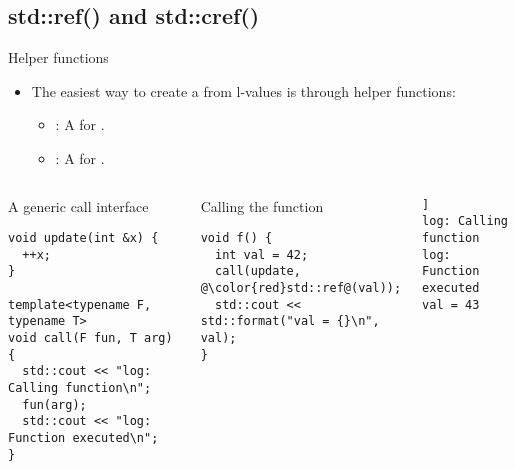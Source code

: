 \subsection{std::ref() and std::cref()}

\begin{frame}[t,fragile]{Helper functions}
\begin{itemize}
  \item The easiest way to create a  from l-values 
        is through helper functions:
    \begin{itemize}
      \item {}: A  for .
      \item {}: A  for .
    \end{itemize}
\end{itemize}

\begin{columns}[T]

\begin{block}{A generic call interface}
\begin{lstlisting}[basicstyle=\mode<presentation>{\tiny}]
void update(int &x) {
  ++x;
}

template<typename F, typename T>
void call(F fun, T arg) {
  std::cout << "log: Calling function\n";
  fun(arg);
  std::cout << "log: Function executed\n";
}
\end{lstlisting}
\end{block}

\pause
{}
\begin{block}{Calling the function}
\begin{lstlisting}[basicstyle=\mode<presentation>{\tiny},escapechar=@]
void f() {
  int val = 42;
  call(update, @\color{red}std::ref@(val));
  std::cout << std::format("val = {}\n", val);
}
\end{lstlisting}
\end{block}

\pause
\begin{lstlisting}[style=terminal,basicstyle=\mode<presentation>{\tiny}]]
log: Calling function
log: Function executed
val = 43
\end{lstlisting}

\end{columns}
\end{frame}


